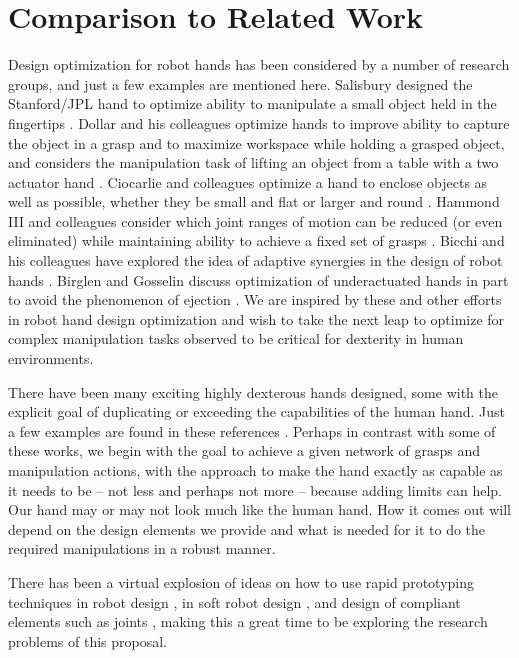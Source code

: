 \section{Comparison to Related Work}

Design optimization for robot hands has been considered by a number of research groups, and just a few examples are mentioned here.   Salisbury  designed the Stanford/JPL hand to optimize ability to manipulate a small object held in the fingertips \cite{salisbury1982articulated}.  Dollar and his colleagues optimize hands to improve ability to capture the object in a grasp and to maximize workspace while holding a grasped object, and considers the manipulation task of lifting an object from a table with a two actuator hand \cite{borrasDollar2015,ma2014linkage,odhner2015stable}.     Ciocarlie and colleagues optimize a hand to enclose objects as well as possible, whether they be small and flat or larger and round \cite{ciocarlie2014velo}.    Hammond III and colleagues consider which joint ranges of motion can be reduced (or even eliminated) while maintaining ability to achieve a fixed set of grasps \cite{hammond2012towards}.   Bicchi and his colleagues have explored the idea of adaptive synergies in the design of robot hands \cite{catalano2014adaptive}.   Birglen and Gosselin discuss optimization of underactuated hands in part to avoid the phenomenon of ejection \cite{birglen2006geometric}.    We are inspired by these and other efforts in robot hand design optimization and wish to take the next leap to optimize for complex manipulation tasks observed to be critical for dexterity in human environments.

There have been many exciting highly dexterous hands designed, some with the explicit goal of duplicating or exceeding the capabilities of the human hand.   Just a few examples are found in these references \cite{jacobsen1986design,vande2004act,ShadowHand,mouri2002anthropomorphic,lovchik1999robonaut,grebenstein2011dlr,xudesign}.    Perhaps in contrast with some of these works, we begin with the goal to achieve a given network of grasps and manipulation actions, with the approach to make the hand exactly as capable as it needs to be -- not less and perhaps not more -- because adding limits can help.   Our hand may or may not look much like the human hand.   How it comes out will depend on the design elements we provide and what is needed for it to do the required manipulations in a robust manner.

There has been a virtual explosion of ideas on how to use rapid prototyping techniques in robot design \cite{dollar2010highly}, in soft robot design \cite{hirose1978development,deimel2015novel,rus2015design,wehner2014pneumatic,polygerinos2015modeling}, and design of compliant elements such as joints \cite{kuo2016novel}, making this a great time to be exploring the research problems of this proposal.


